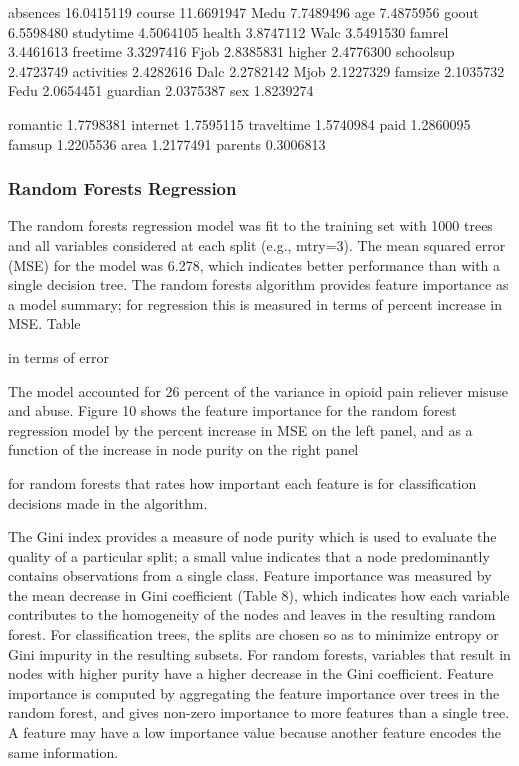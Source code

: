 \documentclass[sigconf]{acmart}
\begin{document}
absences	16.0415119		
course	    11.6691947		
Medu	    7.7489496		
age	        7.4875956		
goout	    6.5598480		
studytime	4.5064105		
health	    3.8747112		
Walc	    3.5491530		
famrel	    3.4461613		
freetime	3.3297416	
Fjob        2.8385831		
higher      2.4776300		
schoolsup	2.4723749		
activities	2.4282616		
Dalc	    2.2782142		
Mjob	    2.1227329		
famsize	    2.1035732		
Fedu	    2.0654451		
guardian	2.0375387		
sex	        1.8239274	

romantic	1.7798381		
internet	1.7595115		
traveltime	1.5740984		
paid	    1.2860095		
famsup	   	1.2205536		
area	    1.2177491		
parents	    0.3006813	






\subsubsection{Random Forests Regression}

The  random forests regression model was fit to the training set with 1000 
trees and all variables considered at each split (e.g., mtry=3). The mean 
squared error (MSE) for the model was 6.278, which indicates better performance 
than with a single decision tree. The random forests algorithm provides feature 
importance as a model summary; for regression this is measured in terms of 
percent increase in MSE. Table 

in terms of error 


The model accounted for 26
percent of the variance in opioid pain reliever misuse and abuse. Figure 10
shows the feature importance for the random forest regression model by the
percent increase in MSE on the left panel, and as a function of the increase
in node purity on the right panel


for random forests 
that rates how important each feature is for classification decisions made 
in the algorithm. 

The Gini index provides a measure of node purity which is used to evaluate the quality of a particular split; a small value indicates 
that a node predominantly contains observations from a single class. 
Feature importance was measured by the mean decrease in Gini coefficient 
(Table 8), which indicates how each variable contributes to the homogeneity 
of the nodes and leaves in the resulting random forest. For classification 
trees, the splits are chosen so as to minimize entropy or Gini impurity in 
the resulting subsets. For random forests, variables that result in nodes 
with higher purity have a higher decrease in the Gini coefficient. Feature 
importance is computed by aggregating the feature importance over trees in 
the random forest, and gives non-zero importance to more features than a 
single tree. A feature may have a low importance value because another feature 
encodes the same information. 
\end{document}
